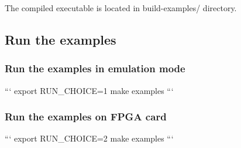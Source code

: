 The compiled executable is located in build-\/examples/ directory.

\subsection*{Run the examples}

\subsubsection*{Run the examples in emulation mode}

``` export R\-U\-N\-\_\-\-C\-H\-O\-I\-C\-E=1 make examples ```

\subsubsection*{Run the examples on F\-P\-G\-A card}

``` export R\-U\-N\-\_\-\-C\-H\-O\-I\-C\-E=2 make examples ``` 